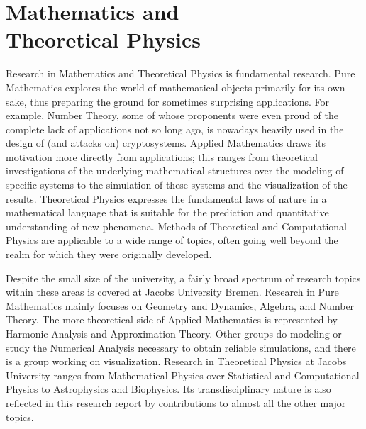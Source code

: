 %
%
%
%
%

\section[Mathematics and Theoretical Physics]{Mathematics and \\ Theoretical Physics}

Research in Mathematics and Theoretical Physics is fundamental
research. Pure Mathematics explores the world of mathematical
objects primarily for its own sake, thus preparing the ground for
sometimes surprising applications. For example, Number Theory, some
of whose proponents were even proud of the complete lack of
applications not so long ago, is nowadays heavily used in the design
of (and attacks on) cryptosystems. Applied Mathematics draws its
motivation more directly from applications; this ranges from
theoretical investigations of the underlying mathematical structures
over the modeling of specific systems to the simulation of these
systems and the visualization of the results. Theoretical Physics
expresses the fundamental laws of nature in a mathematical language
that is suitable for the prediction and quantitative understanding
of new phenomena. Methods of Theoretical and Computational Physics
are applicable to a wide range of topics, often going well beyond
the realm for which they were originally developed.

Despite the small size of the university, a fairly broad spectrum of
research topics within these areas is covered at Jacobs University Bremen. Research in
Pure Mathematics mainly focuses on Geometry and Dynamics, Algebra,
and Number Theory. The more theoretical side of Applied Mathematics
is represented by Harmonic Analysis and Approximation Theory. Other
groups do modeling or study the Numerical Analysis necessary to
obtain reliable simulations, and there is a group working on
visualization. Research in Theoretical Physics at
Jacobs University ranges from Mathematical Physics over
Statistical and Computational Physics to Astrophysics and Biophysics. Its
transdisciplinary nature is also reflected in this research report by contributions
to almost all the other major topics.





% 

